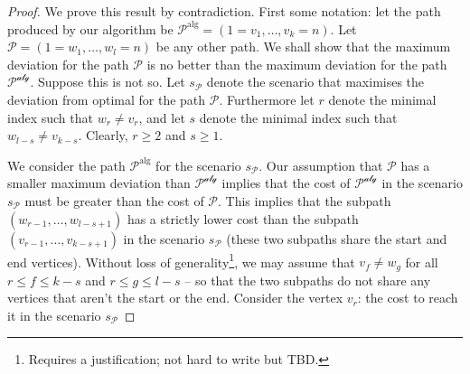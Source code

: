 \documentclass{article}
\begin{document}
\begin{proof}
We prove this result by contradiction. First some notation: let the path produced by our algorithm be $\mathcal{P}^{\textrm{alg}} = (1 = v_1,\dots,v_k = n)$. Let $\mathcal{P} = (1 = w_1,\dots, w_l = n)$ be any other path. We shall show that the maximum deviation for the path $\mathcal{P}$ is no better than the maximum deviation for the path $\mathcal{P^{\textrm{alg}}}$. Suppose this is not so. Let $s_{\mathcal{P}}$ denote the scenario that maximises the deviation from optimal for the path $\mathcal{P}$. Furthermore let $r$ denote the minimal index such that $w_r \neq v_r$, and let $s$ denote the minimal index such that $w_{l-s} \neq v_{k-s}$. Clearly, $r \geq 2$ and $s \geq 1$.

We consider the path $\mathcal{P}^{\textrm{alg}}$ for the scenario $s_{\mathcal{P}}$. Our assumption that $\mathcal{P}$ has a smaller maximum deviation than $\mathcal{P^{\textrm{alg}}}$ implies that the cost of $\mathcal{P^{\textrm{alg}}}$ in the scenario $s_{\mathcal{P}}$ must be greater than the cost of $\mathcal{P}$. This implies that the subpath $(w_{r-1},\dots,w_{l-s+1})$ has a strictly lower cost than the subpath $(v_{r-1},\dots,v_{k-s+1})$ in the scenario $s_{\mathcal{P}}$ (these two subpaths share the start and end vertices). Without loss of generality\footnote{Requires a justification; not hard to write but TBD.}, we may assume that $v_f \neq w_g$ for all $r \le f \le k-s$ and $r \le g \le l-s$ -- so that the two subpaths do not share any vertices that aren't the start or the end. Consider the vertex $v_r$: the cost to reach it in the scenario $s_{\mathcal{P}}$
\end{proof}
\end{document}
